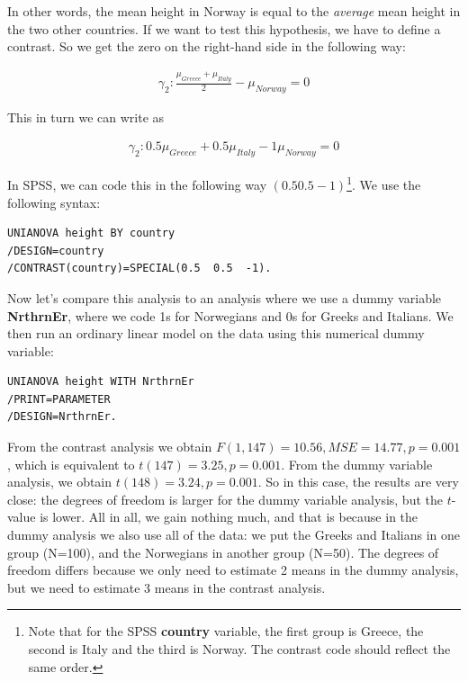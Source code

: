 \documentclass[]{book}\usepackage[]{graphicx}\usepackage[]{color}
\begin{document}
In other words, the mean height in Norway is equal to the \textit{average} mean height in the two other countries. If we want to test this hypothesis, we have to define a contrast. So we get the zero on the right-hand side in the following way:

\begin{eqnarray}
\gamma_2 : \frac{\mu_{Greece} + \mu_{Italy}} {2} - \mu_{Norway}  = 0 
\end{eqnarray}


This in turn we can write as 

\begin{eqnarray}
\gamma_2 : 0.5 \mu_{Greece} + 0.5 \mu_{Italy} - 1 \mu_{Norway}  = 0 
\end{eqnarray}


In SPSS, we can code this in the following way $(0.5 0.5 -1)$\footnote{Note that for the SPSS  \textbf{country} variable, the first group is Greece, the second is Italy and the third is Norway. The contrast code should reflect the same order.}. We use the following syntax:

\begin{verbatim}
UNIANOVA height BY country
/DESIGN=country
/CONTRAST(country)=SPECIAL(0.5  0.5  -1).
\end{verbatim}


Now let's compare this analysis to an analysis where we use a dummy variable \textbf{NrthrnEr}, where we code 1s for Norwegians and 0s for Greeks and Italians. We then run an ordinary linear model on the data using this numerical dummy variable:


\begin{verbatim}
UNIANOVA height WITH NrthrnEr
/PRINT=PARAMETER
/DESIGN=NrthrnEr.
\end{verbatim}

From the contrast analysis we obtain $F(1,147)=10.56, MSE=14.77, p=0.001$, which is equivalent to $t(147)=3.25, p=0.001$. From the dummy variable analysis, we obtain $t(148)= 3.24, p=0.001$. So in this case, the results are very close: the degrees of freedom is larger for the dummy variable analysis, but the $t$-value is lower. All in all, we gain nothing much, and that is because in the dummy analysis we also use all of the data: we put the Greeks and Italians in one group (N=100), and the Norwegians in another group (N=50). The degrees of freedom differs because we only need to estimate 2 means in the dummy analysis, but we need to estimate 3 means in the contrast analysis.
\end{document}
